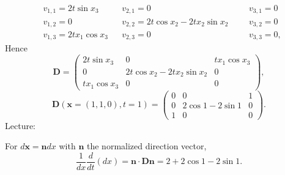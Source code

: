 \documentclass{article}
\newcommand{\ee}{\end{equation}}
\newcommand{\be}{\begin{equation}}
\newcommand{\bs}{\boldsymbol}
\begin{document}
\begin{enumerate}
\begin{align}
&v_{1,1} = 2t\sin x_3 &&v_{2,1} = 0 &&&v_{3,1} = 0 \\ \nonumber
&v_{1,2} = 0 &&v_{2,2} = 2t\cos x_2 - 2tx_2\sin x_2 &&&v_{3,2} = 0 \\ \nonumber
&v_{1,3} = 2tx_1 \cos x_3 &&v_{2,3} = 0 &&&v_{3,3} = 0,
\end{align}
Hence
\be
\bs D = \begin{pmatrix}
2t\sin x_3 & 0 & tx_1 \cos x_3 \\
0 & 2t\cos x_2 - 2t x_2 \sin x_2 & 0 \\
t x_1 \cos x_3 & 0 & 0
\end{pmatrix},
\ee
\be
\bs D(\bs x = (1,1,0), t = 1) = \begin{pmatrix}
0 & 0 & 1 \\
0 & 2\cos 1 - 2\sin 1 & 0 \\
1 & 0 & 0
\end{pmatrix}.
\ee
Lecture:

For $d\bs x = \bs n dx$ with $\bs n$ the normalized direction vector,
\be
\frac{1}{dx}\frac{d}{dt}(dx) = \bs n \cdot \bs D \bs n = 2 + 2\cos 1 - 2\sin 1.
\ee
\end{enumerate}
\end{document}
